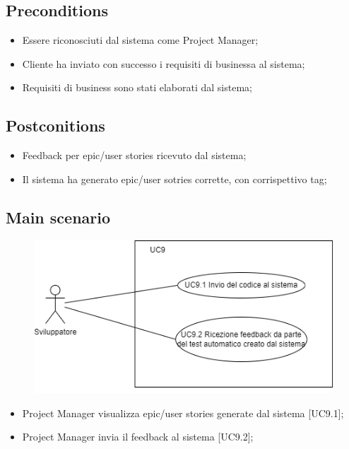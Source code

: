 \documentclass{article}
\begin{document}
    \subsection*{Preconditions}
        \begin{itemize}
            \item Essere riconosciuti dal sistema come Project Manager;
            \item Cliente ha inviato con successo i requisiti di businessa al sistema;
            \item Requisiti di business sono stati elaborati dal sistema;
        \end{itemize}
        
    \subsection*{Postconitions}
        \begin{itemize}
            \item Feedback per epic/user stories ricevuto dal sistema;
            \item Il sistema ha generato epic/user sotries corrette, con corrispettivo tag;
        \end{itemize}
        
    \subsection*{Main scenario}
        \begin{figure}[h]
          \centering
          \includegraphics{./imgUML/UC9-zoom.png}
          \label{fig:immagine}
        \end{figure}

        \begin{itemize}
            \item Project Manager visualizza epic/user stories generate dal sistema [UC9.1];
            \item Project Manager invia il feedback al sistema [UC9.2];
        \end{itemize}
        
\end{document}
